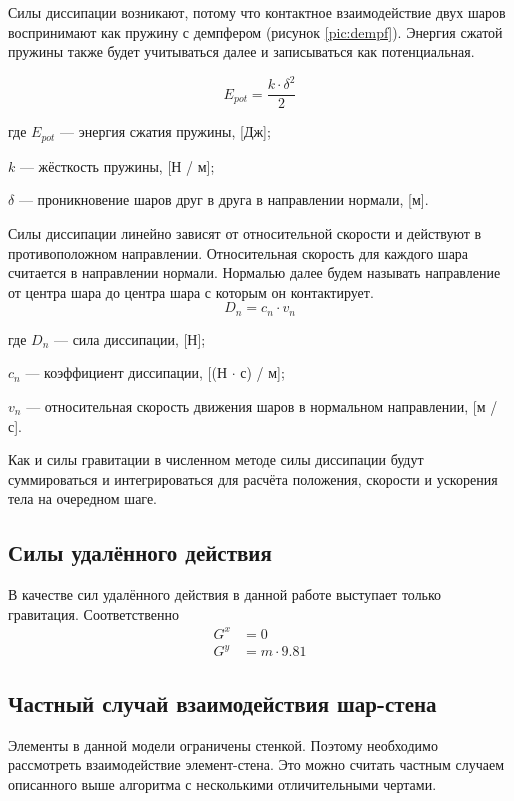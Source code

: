 \documentclass[a4paper]{article}
\begin{document}
Силы диссипации возникают, потому что контактное взаимодействие двух шаров воспринимают как пружину с демпфером (рисунок \ref{pic:dempf}). 
Энергия сжатой пружины также будет учитываться далее и записываться как потенциальная.

\[
E_{pot} = \dfrac{k \cdot \delta^2}{2}
\]

где $E_{pot}$ --- энергия сжатия пружины, [Дж];

$k$ --- жёсткость пружины, [Н / м];

$\delta$ --- проникновение шаров друг в друга в направлении нормали, [м].

Силы диссипации линейно зависят от относительной скорости и действуют в противоположном направлении.
Относительная скорость для каждого шара считается в направлении нормали.
Нормалью  далее будем называть направление от центра шара до центра шара с которым он контактирует.
\begin{equation}
\label{dempf_force}
D_n = c_n \cdot v_n
\end{equation}

где $D_n$ --- сила диссипации, [Н];

$c_n$ --- коэффициент диссипации, [(Н $\cdot$ с) / м];

$v_n$ --- относительная скорость движения шаров в нормальном направлении, [м / с].

Как и силы гравитации в численном методе силы диссипации будут суммироваться и интегрироваться для расчёта положения, скорости и ускорения тела на очередном шаге.


\subsection{Силы удалённого действия}
\label{gravitation_subsection}

В качестве сил удалённого действия в данной работе выступает только гравитация.
Соответственно
\begin{align}
G^x &= 0 \\
G^y &= m \cdot 9.81
\end{align}

\subsection{Частный случай взаимодействия шар-стена}
\label{wall_subsection}

Элементы в данной модели ограничены стенкой. 
Поэтому необходимо рассмотреть взаимодействие элемент-стена.
Это можно считать частным случаем описанного выше алгоритма с несколькими отличительными чертами.
\end{document}
